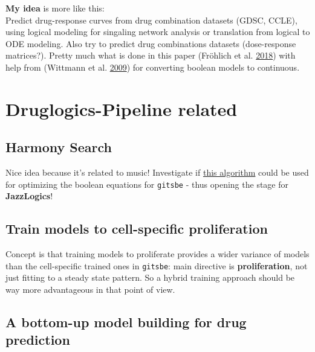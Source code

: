 \documentclass[
  12pt,
]{book}
\begin{document}
\textbf{My idea} is more like this:\\
Predict drug-response curves from drug combination datasets (GDSC, CCLE),
using logical modeling for singaling network analysis or translation from
logical to ODE modeling. Also try to predict drug combinations datasets
(dose-response matrices?). Pretty much what is done in this paper (Fröhlich et al. \protect\hyperlink{ref-Frohlich2018}{2018})
with help from (Wittmann et al. \protect\hyperlink{ref-Wittmann2009}{2009}) for converting boolean models to continuous.

\hypertarget{druglogics-pipeline-related}{%
\section*{Druglogics-Pipeline related}\label{druglogics-pipeline-related}}

\hypertarget{harmony-search}{%
\subsection*{Harmony Search}\label{harmony-search}}

Nice idea because it's related to music!
Investigate if \href{https://doi.org/10.1016/j.proeng.2016.07.510}{this algorithm} could be used for optimizing the boolean equations for \texttt{gitsbe} - thus opening the stage for \textbf{JazzLogics}!

\hypertarget{train-models-to-cell-specific-proliferation}{%
\subsection*{Train models to cell-specific proliferation}\label{train-models-to-cell-specific-proliferation}}

Concept is that training models to proliferate provides a wider variance of models than the cell-specific trained ones in \texttt{gitsbe}: main directive is \textbf{proliferation}, not just fitting to a steady state pattern.
So a hybrid training approach should be way more advantageous in that point of view.

\hypertarget{a-bottom-up-model-building-for-drug-prediction}{%
\subsection*{A bottom-up model building for drug prediction}\label{a-bottom-up-model-building-for-drug-prediction}}
\end{document}
